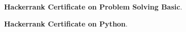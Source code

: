 \begin{cvempty} %
  \begin{cvitems} %
    \item {\textbf{Hackerrank Certificate on Problem Solving Basic}.\hfill{}}
    \item {\textbf{Hackerrank Certificate on Python}.\hfill{}}
  \end{cvitems}

\end{cvempty}
